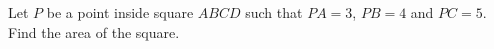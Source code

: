 Let $P$ be a point inside square $ABCD$ such that $PA=3$, $PB=4$ and $PC=5$. Find the area of the square.
